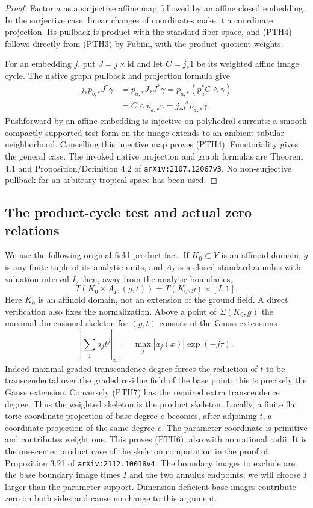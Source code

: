 \begin{proof}
Factor $a$ as a surjective affine map followed by an affine closed
embedding.  In the surjective case, linear changes of coordinates
make it a coordinate projection.  Its pullback is product with the
standard fiber space, and (PTH4) follows directly from (PTH3) by
Fubini, with the product quotient weights.

For an embedding $j$, put $J=j\times\mathrm{id}$ and let
$C=j_*1$ be its weighted affine image cycle.  The native graph
pullback and projection formula give
\[
 \begin{split}
 j_*p_{b,*}J^*\gamma
 &=p_{a,*}J_*J^*\gamma
   =p_{a,*}(p_a^*C\wedge\gamma)\\
 &=C\wedge p_{a,*}\gamma
   =j_*j^*p_{a,*}\gamma.
 \end{split}
 \tag{PTH5}
\]
Pushforward by an affine embedding is injective on polyhedral
currents: a smooth compactly supported test form on the image
extends to an ambient tubular neighborhood.  Cancelling this
injective map proves (PTH4).  Functoriality gives the general case.
The invoked native projection and graph formulas are Theorem 4.1
and Proposition/Definition 4.2 of
\texttt{arXiv:2107.12067v3}.  No non-surjective pullback for an
arbitrary tropical space has been used.
\end{proof}

\subsection{The product-cycle test and actual zero relations}

We use the following original-field product fact.  If $K_0\subset Y$
is an affinoid domain, $g$ is any finite tuple of its analytic units,
and $A_I$ is a closed standard annulus with valuation interval $I$,
then, away from the analytic boundaries,
\[
 T(K_0\times A_I,(g,t))=T(K_0,g)\times[I,1].
 \tag{PTH6}
\]
Here $K_0$ is an affinoid domain, not an extension of the ground
field.  A direct verification also fixes the normalization.  Above
a point of $\Sigma(K_0,g)$ the maximal-dimensional skeleton for
$(g,t)$ consists of the Gauss extensions
\[
 \left|\sum_j a_jt^j\right|_{x,\tau}
                 =\max_j |a_j(x)|\exp(-j\tau).
 \tag{PTH7}
\]
Indeed maximal graded transcendence degree forces the reduction
of $t$ to be transcendental over the graded residue field of the
base point; this is precisely the Gauss extension.  Conversely
(PTH7) has the required extra transcendence degree.  Thus the
weighted skeleton is the product skeleton.  Locally, a finite flat
toric coordinate projection of base degree $e$ becomes, after
adjoining $t$, a coordinate projection of the same degree $e$.
The parameter coordinate is primitive and contributes weight one.
This proves (PTH6), also with nonrational radii.  It is the
one-center product case of the skeleton computation in the proof
of Proposition 3.21 of \texttt{arXiv:2112.10018v4}.  The boundary
images to exclude are the base boundary image times $I$ and the
two annulus endpoints; we will choose $I$ larger than the parameter
support.  Dimension-deficient base images contribute zero on both
sides and cause no change to this argument.

